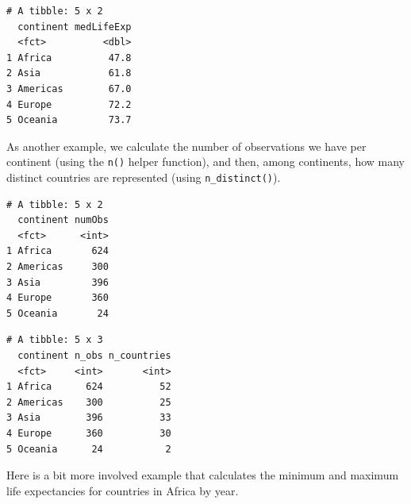 \documentclass[]{krantz}
\makeatletter
\newenvironment{Shaded}{\begin{snugshade}}{\end{snugshade}}
\newcommand{\KeywordTok}[1]{\textcolor[rgb]{0.27,0.27,0.27}{\textbf{#1}}}
\newcommand{\DataTypeTok}[1]{\textcolor[rgb]{0.27,0.27,0.27}{#1}}
\newcommand{\StringTok}[1]{\textcolor[rgb]{0.5,0.5,0.5}{#1}}
\newcommand{\OperatorTok}[1]{\textcolor[rgb]{0.43,0.43,0.43}{\textbf{#1}}}
\newcommand{\NormalTok}[1]{#1}
\newenvironment{kframe}{%
\medskip{}
\setlength{\fboxsep}{.8em}
 \def\at@end@of@kframe{}%
 \ifinner\ifhmode%
  \def\at@end@of@kframe{\end{minipage}}%
  \begin{minipage}{\columnwidth}%
 \fi\fi%
 \def\FrameCommand##1{\hskip\@totalleftmargin \hskip-\fboxsep
 \colorbox{shadecolor}{##1}\hskip-\fboxsep
     \hskip-\linewidth \hskip-\@totalleftmargin \hskip\columnwidth}%
 \MakeFramed {\advance\hsize-\width
   \@totalleftmargin\z@ \linewidth\hsize
   \@setminipage}}%
 {\par\unskip\endMakeFramed%
 \at@end@of@kframe}
\renewenvironment{Shaded}{\begin{kframe}}{\end{kframe}}
\makeatother
\begin{document}
\begin{verbatim}
# A tibble: 5 x 2
  continent medLifeExp
  <fct>          <dbl>
1 Africa          47.8
2 Asia            61.8
3 Americas        67.0
4 Europe          72.2
5 Oceania         73.7
\end{verbatim}

As another example, we calculate the number of observations we have per
continent (using the \texttt{n()} helper function), and then, among
continents, how many distinct countries are represented (using
\texttt{n\_distinct()}).

\begin{Shaded}
\end{Shaded}

\begin{verbatim}
# A tibble: 5 x 2
  continent numObs
  <fct>      <int>
1 Africa       624
2 Americas     300
3 Asia         396
4 Europe       360
5 Oceania       24
\end{verbatim}

\begin{Shaded}
\end{Shaded}

\begin{verbatim}
# A tibble: 5 x 3
  continent n_obs n_countries
  <fct>     <int>       <int>
1 Africa      624          52
2 Americas    300          25
3 Asia        396          33
4 Europe      360          30
5 Oceania      24           2
\end{verbatim}

Here is a bit more involved example that calculates the minimum and
maximum life expectancies for countries in Africa by year.
\end{document}
